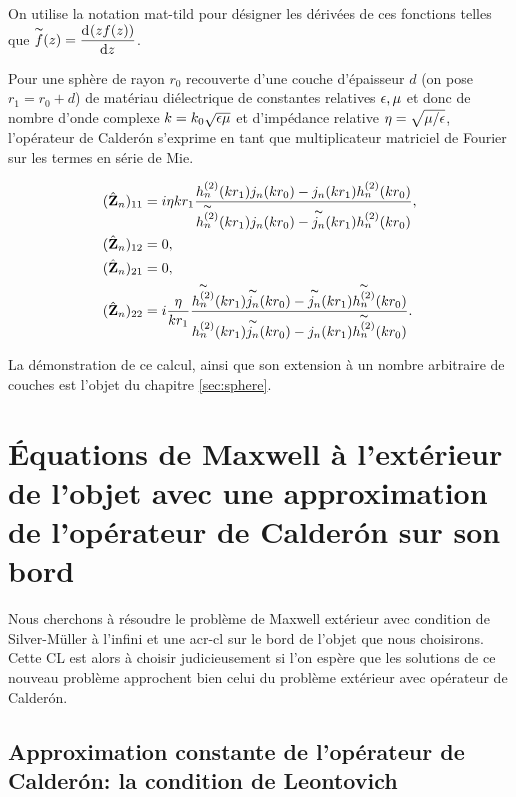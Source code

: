     On utilise la notation \gls{mat-tild} pour désigner les dérivées de ces fonctions telles que \(\tilde{f}(z) = \ddp{z}{(zf(z))}\).

    Pour une sphère de rayon \(r_0\) recouverte d'une couche d'épaisseur \(d\) (on pose \(r_1=r_0 + d\)) de matériau diélectrique de constantes relatives \(\eps,\mu\) et donc de nombre d'onde complexe \(k = k_0\sqrt{\eps\mu}\) et d'impédance relative \(\eta=\sqrt{{\mu}/{\eps}}\), l'opérateur de Calderón s'exprime en tant que multiplicateur  matriciel de Fourier sur les termes en série de Mie.

    \begin{align*}
      (\hat \mZ_n)_{11} &=  i\eta kr_1 
        \frac{
          h^{(2)}_n(kr_1)j_n(kr_0)-j_n(kr_1)h^{(2)}_n(kr_0)
        }{
          \tilde{h^{(2)}_n}(kr_1)j_n(kr_0)-\tilde{j_n}(kr_1)h^{(2)}_n(kr_0)
        },
      \\
      (\hat \mZ_n)_{12} &= 0,
      \\
      (\hat \mZ_n)_{21} &= 0,
      \\
      (\hat \mZ_n)_{22} &= i \frac{\eta}{kr_1}
        \frac{
          \tilde{h^{(2)}_n}(kr_1)\tilde{j_n}(kr_0)-\tilde{j_n}(kr_1)\tilde{h^{(2)}_n}(kr_0)
        }{
          {h^{(2)}_n}(kr_1)\tilde{j_n}(kr_0)-{j_n}(kr_1)\tilde{h^{(2)}_n}(kr_0)
        }.
    \end{align*}

    La démonstration de ce calcul, ainsi que son extension à un nombre arbitraire de couches est l'objet du chapitre \ref{sec:sphere}.

\section[Problème extérieur et condition limite de Calderón]{Équations de Maxwell à l'extérieur de l'objet avec une approximation de l'opérateur de Calderón sur son bord}

  Nous cherchons à résoudre le problème de Maxwell extérieur avec condition de Silver-Müller à l'infini et une \gls{acr-cl} sur le bord de l'objet que nous choisirons.
  Cette CL est alors à choisir judicieusement si l'on espère que les solutions de ce nouveau problème approchent bien celui du problème extérieur avec opérateur de Calderón.

  \subsection{Approximation constante de l'opérateur de Calderón: la condition de Leontovich}
        
